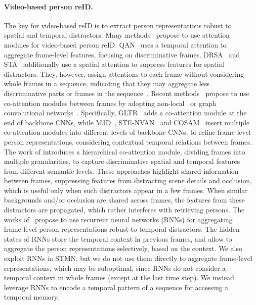 \documentclass[10pt,twocolumn,letterpaper]{article}
\begin{document}
	\vspace{-0.4cm}
	\paragraph{Video-based person reID.}
	
		The key for video-based reID is to extract person representations robust to spatial and temporal distractors. Many methods~\cite{liu2017quality,li2018diversity,fu2019sta} propose to use attention modules for video-based person reID. QAN~\cite{liu2017quality} uses a temporal attention to aggregate frame-level features, focusing on discriminative frames. DRSA~\cite{li2018diversity} and STA~\cite{fu2019sta} additionally use a spatial attention to suppress features for spatial distractors. They, however, assign attentions to each frame without considering whole frames in a sequence, indicating that they may aggregate less discriminative parts or frames in the sequence~\cite{zhang2020multi,hou2020temporal}. Recent methods~\cite{li2019multi,li2019global,liu2019spatially,subramaniam2019co,yan2020learning} propose to use co-attention modules between frames by adopting non-local~\cite{wang2018non} or graph convolutional networks~\cite{kipf2017semi}. Specifically, GLTR~\cite{li2019global} adds a co-attention module at the end of backbone CNNs, while M3D~\cite{li2019multi}, STE-NVAN~\cite{liu2019spatially} and COSAM~\cite{subramaniam2019co} insert multiple co-attention modules into different levels of backbone CNNs, to refine frame-level person representations, considering contextual temporal relations between frames. The work of \cite{yan2020learning,yang2020spatial} introduces a hierarchical co-attention module, dividing frames into multiple granularities, to capture discriminative spatial and temporal features from different semantic levels. These approaches highlight shared information between frames, suppressing features from distracting scene details and occlusion, which is useful only when such distractors appear in a few frames. When similar backgrounds and/or occlusion are shared across frames, the features from these distractors are propagated, which rather interferes with retrieving persons. The works of~\cite{mclaughlin2016recurrent,yan2016person,zhou2017see} propose to use recurrent neural networks (RNNs) for aggregating frame-level person representations robust to temporal distractors. The hidden states of RNNs store the temporal context in previous frames, and allow to aggregate the person representations selectively, based on the context. We also exploit RNNs in STMN, but we do not use them directly to aggregate frame-level representations, which may be suboptimal, since RNNs do not consider a temporal context in whole frames (except at the last time step). We instead leverage RNNs to encode a temporal pattern of a sequence for accessing a temporal memory.
\end{document}
